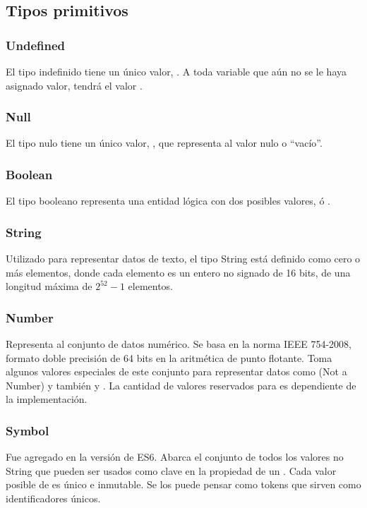\subsection{Tipos primitivos}
\label{subsec:introtiposprimitivos}

\subsubsection{Undefined} 
El tipo indefinido tiene un único valor, . A toda variable que aún no se le haya asignado valor, tendrá el valor .

\subsubsection{Null} 
El tipo nulo tiene un único valor, , que representa al valor nulo o "`vacío"'.

\subsubsection{Boolean} 
El tipo booleano representa una entidad lógica con dos posibles valores,  ó .

\subsubsection{String} 
Utilizado para representar datos de texto, el tipo String está definido como cero o más elementos, donde cada elemento es un entero no signado de 16 bits, de una longitud máxima de $2^{52}-1$ elementos.

\subsubsection{Number} 
Representa al conjunto de datos numérico. Se basa en la norma IEEE 754-2008, formato doble precisión de 64 bits en la aritmética de punto flotante. Toma algunos valores especiales de este conjunto para representar datos como  (Not a Number) y también  y . La cantidad de valores reservados para  es dependiente de la implementación.

\subsubsection{Symbol} 
Fue agregado en la versión de ES6. Abarca el conjunto de todos los valores no String que pueden ser usados como clave en la propiedad de un . Cada valor posible de  es único e inmutable. Se los puede pensar como tokens que sirven como identificadores únicos. 

